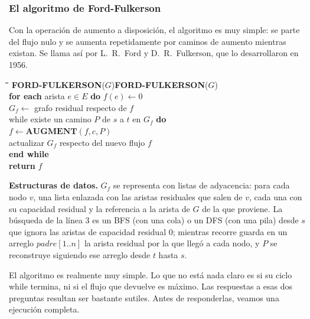 \documentclass[12pt, spanish, oneside, openany]{book}
\newcommand{\pl}[1]{\makebox[1.6em][r]{\texttt{\footnotesize #1}}\hspace{0.9em}}
\newenvironment{pseudo}[1]{%
  \begin{center}%
  \begin{mdframed}[style=pseudobox]%
  \small
  \begin{tabbing}%
  \hspace{2.5em}\=\hspace{1.5em}\=\hspace{1.5em}\=\hspace{1.5em}\=\hspace{1.5em}\=\kill
  \def\pseudotitulo{#1}\ifx\pseudotitulo\empty\else#1\\[3pt]\fi}%
  {\end{tabbing}\end{mdframed}\end{center}}
\newenvironment{estructuras}%
  {\begin{center}\begin{minipage}{0.93\textwidth}\begin{mdframed}[style=estrbox]%
   \small\textbf{Estructuras de datos.}\;}%
  {\end{mdframed}\end{minipage}\end{center}}
\theoremstyle{uprightplain}
\theoremstyle{definition}
\theoremstyle{remark}
\theoremstyle{definition}
\begin{document}
\subsubsection{El algoritmo de Ford-Fulkerson}

Con la operación de aumento a disposición, el algoritmo es muy simple: se parte del flujo nulo y se aumenta repetidamente por caminos de aumento mientras existan. Se llama así por L.~R.~Ford y D.~R.~Fulkerson, que lo desarrollaron en 1956.

\begin{pseudo}{\textbf{FORD-FULKERSON}($G$)}
\pl{1}\> \textbf{for each} arista $e\in E$ \textbf{do} $f(e)\leftarrow 0$\\
\pl{2}\> $G_f \leftarrow$ grafo residual respecto de $f$\\
\pl{3}\> while existe un camino $P$ de $s$ a $t$ en $G_f$ \textbf{do}\\
\pl{4}\>\> $f \leftarrow \textbf{AUGMENT}(f,c,P)$\\
\pl{5}\>\> actualizar $G_f$ respecto del nuevo flujo $f$\\
\pl{6}\> \textbf{end while}\\
\pl{7}\> \textbf{return} $f$
\end{pseudo}

\begin{estructuras}
$G_f$ se representa con listas de adyacencia: para cada nodo $v$, una lista
enlazada con las aristas residuales que salen de $v$, cada una con su capacidad
residual y la referencia a la arista de $G$ de la que proviene. La búsqueda de
la línea $3$ es un BFS (con una cola) o un DFS (con una pila) desde $s$ que
ignora las aristas de capacidad residual $0$; mientras recorre guarda en un
arreglo $\mathit{padre}[1..n]$ la arista residual por la que llegó a cada nodo,
y $P$ se reconstruye siguiendo ese arreglo desde $t$ hasta $s$.
\end{estructuras}

El algoritmo es realmente muy simple. Lo que no está nada claro es si su ciclo while termina, ni si el flujo que devuelve es máximo. Las respuestas a esas dos preguntas resultan ser bastante sutiles. Antes de responderlas, veamos una ejecución completa.
\end{document}

